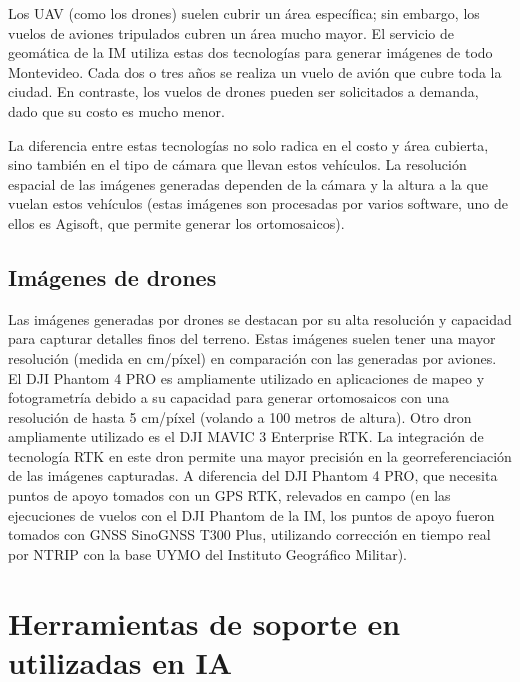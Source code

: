 Los UAV (como los drones) suelen cubrir un área específica; sin embargo, los vuelos de aviones tripulados cubren un área mucho mayor. El servicio de geomática de la IM utiliza estas dos tecnologías para generar imágenes de todo Montevideo. Cada dos o tres años se realiza un vuelo de avión que cubre toda la ciudad. En contraste, los vuelos de drones pueden ser solicitados a demanda, dado que su costo es mucho menor.

La diferencia entre estas tecnologías no solo radica en el costo y área cubierta, sino también en el tipo de cámara que llevan estos vehículos. La resolución espacial de las imágenes generadas dependen de la cámara y la altura a la que vuelan estos vehículos (estas imágenes son procesadas por varios software, uno de ellos es Agisoft, que permite generar los ortomosaicos).

\subsection{Imágenes de drones}
\label{sec:imgUavDrones}

Las imágenes generadas por drones se destacan por su alta resolución y capacidad para capturar detalles finos del terreno. Estas imágenes suelen tener una mayor resolución (medida en cm/píxel) en comparación con las generadas por aviones. El DJI Phantom 4 PRO es ampliamente utilizado en aplicaciones de mapeo y fotogrametría debido a su capacidad para generar ortomosaicos con una resolución de hasta 5 cm/píxel (volando a 100 metros de altura). Otro dron ampliamente utilizado es el DJI MAVIC 3 Enterprise RTK. La integración de tecnología RTK en este dron permite una mayor precisión en la georreferenciación de las imágenes capturadas. A diferencia del DJI Phantom 4 PRO, que necesita puntos de apoyo tomados con un GPS RTK, relevados en campo (en las ejecuciones de vuelos con el DJI Phantom de la IM, los puntos de apoyo fueron tomados con GNSS SinoGNSS T300 Plus, utilizando corrección en tiempo real por NTRIP con la base UYMO del Instituto Geográfico Militar).


\section{Herramientas de soporte en utilizadas en IA}
\label{sec:herramSopIA}

